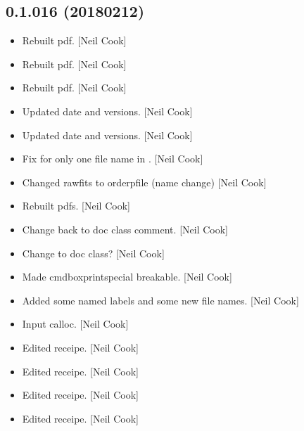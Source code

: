 \documentclass[a4paper,10pt,english]{report}
\begin{document}
\subsection{0.1.016 (2018\sphinxhyphen{}02\sphinxhyphen{}12)}
\label{\detokenize{misc/changelog:id507}}\begin{itemize}
\item {} 
Rebuilt pdf. {[}Neil Cook{]}

\item {} 
Rebuilt pdf. {[}Neil Cook{]}

\item {} 
Rebuilt pdf. {[}Neil Cook{]}

\item {} 
Updated date and versions. {[}Neil Cook{]}

\item {} 
Updated date and versions. {[}Neil Cook{]}

\item {} 
Fix for only one file name in . {[}Neil Cook{]}

\item {} 
Changed rawfits to orderpfile (name change) {[}Neil Cook{]}

\item {} 
Rebuilt pdfs. {[}Neil Cook{]}

\item {} 
Change back to doc class comment. {[}Neil Cook{]}

\item {} 
Change to doc class? {[}Neil Cook{]}

\item {} 
Made cmdboxprintspecial breakable. {[}Neil Cook{]}

\item {} 
Added some named labels and some new file names. {[}Neil Cook{]}

\item {} 
Input calloc. {[}Neil Cook{]}

\item {} 
Edited receipe. {[}Neil Cook{]}

\item {} 
Edited receipe. {[}Neil Cook{]}

\item {} 
Edited receipe. {[}Neil Cook{]}

\item {} 
Edited receipe. {[}Neil Cook{]}

\end{itemize}
\end{document}
